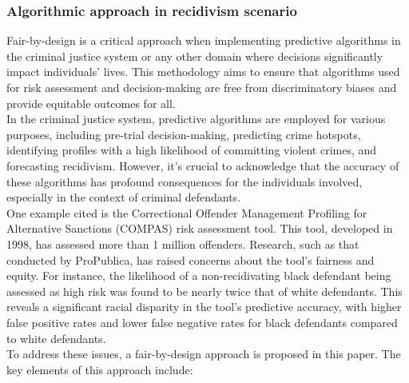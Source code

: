 \documentclass{article}
\begin{document}
\subsubsection{Algorithmic approach in recidivism scenario}
Fair-by-design is a critical approach when implementing predictive algorithms in the criminal justice\cite{Soares2019FairbydesignEM} system or any other domain where decisions significantly impact individuals' lives. This methodology aims to ensure that algorithms used for risk assessment and decision-making are free from discriminatory biases and provide equitable outcomes for all. \\
In the criminal justice system, predictive algorithms are employed for various purposes, including pre-trial decision-making, predicting crime hotspots, identifying profiles with a high likelihood of committing violent crimes, and forecasting recidivism. However, it's crucial to acknowledge that the accuracy of these algorithms has profound consequences for the individuals involved, especially in the context of criminal defendants. \\
One example cited is the Correctional Offender Management Profiling for Alternative Sanctions (COMPAS) risk assessment tool. This tool, developed in 1998, has assessed more than 1 million offenders. Research, such as that conducted by ProPublica, has raised concerns about the tool's fairness and equity. For instance, the likelihood of a non-recidivating black defendant being assessed as high risk was found to be nearly twice that of white defendants. This reveals a significant racial disparity in the tool's predictive accuracy, with higher false positive rates and lower false negative rates for black defendants compared to white defendants.\\
To address these issues, a fair-by-design approach is proposed in this paper. The key elements of this approach include:
\end{document}
